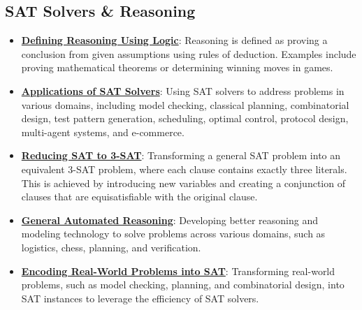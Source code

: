\documentclass{article}%
\begin{document}
%
\subsection{SAT Solvers \& Reasoning}%
\label{subsec:SATSolversReasoning}%
\begin{itemize}[leftmargin=*]%
\item \href{https://purdue.brightspace.com/d2l/common/assets/pdfjs-d2l-dist/1.0.14-legacy/web/viewer.html?file=\%2Fcontent\%2Fenforced\%2F1095467-wl.202510.CS.24300.001\%2F13L1-Logic.pdf\%3Fou\%3D1095467\&lang=en-us\&container=d2l-fileviewer-rendered-pdf\&fullscreen=d2l-fileviewer-rendered-pdf-dialog\&height=667#page=7}{\textbf{Defining Reasoning Using Logic}}: Reasoning is defined as proving a conclusion from given assumptions using rules of deduction. Examples include proving mathematical theorems or determining winning moves in games.%
\item \href{https://purdue.brightspace.com/d2l/common/assets/pdfjs-d2l-dist/1.0.14-legacy/web/viewer.html?file=\%2Fcontent\%2Fenforced\%2F1095467-wl.202510.CS.24300.001\%2F13L1-Logic.pdf\%3Fou\%3D1095467\&lang=en-us\&container=d2l-fileviewer-rendered-pdf\&fullscreen=d2l-fileviewer-rendered-pdf-dialog\&height=667#page=20}{\textbf{Applications of SAT Solvers}}: Using SAT solvers to address problems in various domains, including model checking, classical planning, combinatorial design, test pattern generation, scheduling, optimal control, protocol design, multi-agent systems, and e-commerce.%
\item \href{https://purdue.brightspace.com/d2l/common/assets/pdfjs-d2l-dist/1.0.14-legacy/web/viewer.html?file=\%2Fcontent\%2Fenforced\%2F1095467-wl.202510.CS.24300.001\%2F13L1-Logic.pdf\%3Fou\%3D1095467\&lang=en-us\&container=d2l-fileviewer-rendered-pdf\&fullscreen=d2l-fileviewer-rendered-pdf-dialog\&height=667#page=24}{\textbf{Reducing SAT to 3-SAT}}: Transforming a general SAT problem into an equivalent 3-SAT problem, where each clause contains exactly three literals. This is achieved by introducing new variables and creating a conjunction of clauses that are equisatisfiable with the original clause.%
\item \href{https://purdue.brightspace.com/d2l/common/assets/pdfjs-d2l-dist/1.0.14-legacy/web/viewer.html?file=\%2Fcontent\%2Fenforced\%2F1095467-wl.202510.CS.24300.001\%2F15L2-SAT.pdf\%3Fou\%3D1095467\&lang=en-us\&container=d2l-fileviewer-rendered-pdf\&fullscreen=d2l-fileviewer-rendered-pdf-dialog\&height=667#page=3}{\textbf{General Automated Reasoning}}: Developing better reasoning and modeling technology to solve problems across various domains, such as logistics, chess, planning, and verification.%
\item \href{https://purdue.brightspace.com/d2l/common/assets/pdfjs-d2l-dist/1.0.14-legacy/web/viewer.html?file=\%2Fcontent\%2Fenforced\%2F1095467-wl.202510.CS.24300.001\%2F15L2-SAT.pdf\%3Fou\%3D1095467\&lang=en-us\&container=d2l-fileviewer-rendered-pdf\&fullscreen=d2l-fileviewer-rendered-pdf-dialog\&height=667#page=6}{\textbf{Encoding Real-World Problems into SAT}}: Transforming real-world problems, such as model checking, planning, and combinatorial design, into SAT instances to leverage the efficiency of SAT solvers.%
\end{itemize}
\end{document}
